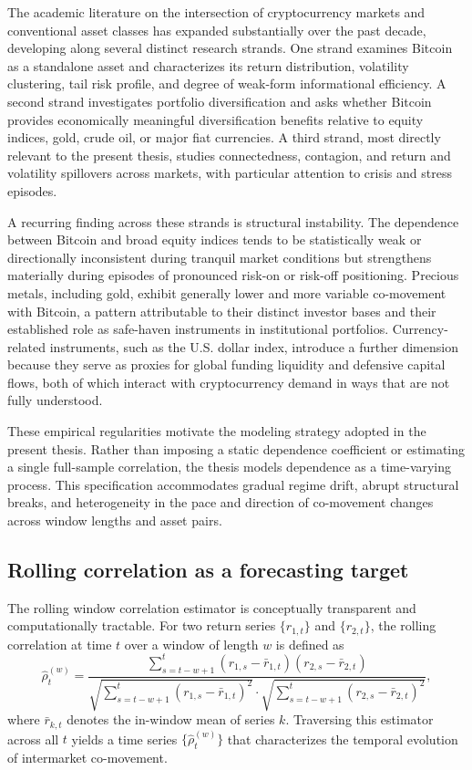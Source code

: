 The academic literature on the intersection of cryptocurrency markets and conventional asset classes has expanded substantially over the past decade, developing along several distinct research strands. One strand examines Bitcoin as a standalone asset and characterizes its return distribution, volatility clustering, tail risk profile, and degree of weak-form informational efficiency. A second strand investigates portfolio diversification and asks whether Bitcoin provides economically meaningful diversification benefits relative to equity indices, gold, crude oil, or major fiat currencies. A third strand, most directly relevant to the present thesis, studies connectedness, contagion, and return and volatility spillovers across markets, with particular attention to crisis and stress episodes.

A recurring finding across these strands is structural instability. The dependence between Bitcoin and broad equity indices tends to be statistically weak or directionally inconsistent during tranquil market conditions but strengthens materially during episodes of pronounced risk-on or risk-off positioning. Precious metals, including gold, exhibit generally lower and more variable co-movement with Bitcoin, a pattern attributable to their distinct investor bases and their established role as safe-haven instruments in institutional portfolios. Currency-related instruments, such as the U.S. dollar index, introduce a further dimension because they serve as proxies for global funding liquidity and defensive capital flows, both of which interact with cryptocurrency demand in ways that are not fully understood.

These empirical regularities motivate the modeling strategy adopted in the present thesis. Rather than imposing a static dependence coefficient or estimating a single full-sample correlation, the thesis models dependence as a time-varying process. This specification accommodates gradual regime drift, abrupt structural breaks, and heterogeneity in the pace and direction of co-movement changes across window lengths and asset pairs.

\subsection{Rolling correlation as a forecasting target}

The rolling window correlation estimator is conceptually transparent and computationally tractable. For two return series $\{r_{1,t}\}$ and $\{r_{2,t}\}$, the rolling correlation at time $t$ over a window of length $w$ is defined as
\begin{equation}
    \hat{\rho}_{t}^{(w)} = \frac{\sum_{s=t-w+1}^{t}(r_{1,s} - \bar{r}_{1,t})(r_{2,s} - \bar{r}_{2,t})}
    {\sqrt{\sum_{s=t-w+1}^{t}(r_{1,s} - \bar{r}_{1,t})^{2}} \cdot
     \sqrt{\sum_{s=t-w+1}^{t}(r_{2,s} - \bar{r}_{2,t})^{2}}},
\end{equation}
where $\bar{r}_{k,t}$ denotes the in-window mean of series $k$. Traversing this estimator across all $t$ yields a time series $\{\hat{\rho}_{t}^{(w)}\}$ that characterizes the temporal evolution of intermarket co-movement.

